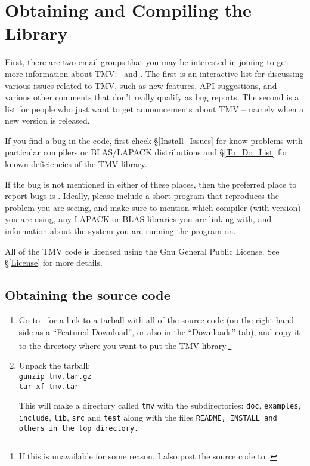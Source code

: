 
\section{Obtaining and Compiling the Library}
\label{Install}

First, there are two email groups that you may be interested in joining to get more 
information about TMV:
\mygrouptt\ and \mygroupann.
The first is an interactive list for discussing various issues related to TMV, such as 
new features, API suggestions, and various other comments that don't really qualify
as bug reports.  The second is a list for people who just want to get announcements 
about TMV -- namely when a new version is released.

If you find a bug in the code, first check \S\ref{Install_Issues} for know problems with 
particular compilers or BLAS/LAPACK distributions and \S\ref{To_Do_List} for known
deficiencies of the TMV library.

If the bug is not mentioned in either of these places, then the preferred place to report 
bugs is \myissues.  Ideally, please include a short program that reproduces the problem
you are seeing, and make sure to mention which compiler (with version) you are using,
any LAPACK or BLAS libraries you are linking with, and information about the system 
you are running the program on. 

All of the TMV code is licensed using the Gnu General Public License.  See 
\S\ref{License} for more details.

\subsection{Obtaining the source code}
\label{Install_Obtain}


\begin{enumerate}

\item
Go to \website\ for a link to a tarball with all of the source code (on the right hand side as a
``Featured Download'', or also in the ``Downloads'' tab), and copy
it to the directory where you want to put the TMV library.\footnote{
If this is unavailable for some reason, I also post the source code to \altwebsite.}

\item
Unpack the tarball:\\
\texttt{gunzip tmv\tmvversion .tar.gz}\\
\texttt{tar xf tmv\tmvversion .tar}

This will make a directory called \texttt{tmv\tmvversion} with the subdirectories:
\texttt{doc}, \texttt{examples}, \texttt{include}, \texttt{lib}, \texttt{src} and \texttt{test} 
along with the files \tt{README}, \tt{INSTALL} and others
in the top directory.

\end{enumerate}

